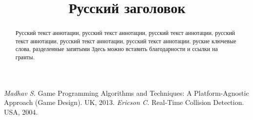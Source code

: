 \documentclass[intlimits,twoside,a4paper,11pt]{article}
\begin{document}
    \begin{translatedpart}




        \title{Русский заголовок}

        \maketranslatedtitle

        \begin{abstract}
            Русский текст аннотации, русский текст аннотации, русский текст аннотации, русский текст аннотации, русский текст аннотации, русский текст аннотации.
            \keywords руские ключевые слова, разделенные запятыми
            \autocitationexample
            \acknowledgements Здесь можно вставить благодарности и ссылки на гранты.
        \end{abstract}

        \begin{thebibliography}{9}
             {\it Madhav S.} Game Programming Algorithms and Techniques: A Platform-Agnostic Approach (Game Design). UK, 2013.
             {\it Ericson C.} Real-Time Collision Detection. USA, 2004.
        \end{thebibliography}


    \end{translatedpart}

\end{document}
